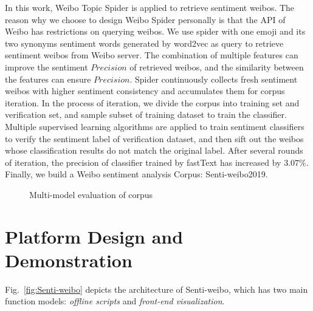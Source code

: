 \documentclass[runningheads]{llncs}
\begin{document}
In this work, Weibo Topic Spider is applied to retrieve sentiment weibos. The reason why we choose to design Weibo Spider personally is that the API of Weibo has restrictions on querying weibos. We use spider with one emoji and its two synonyms sentiment words generated by word2vec as query to retrieve sentiment weibos from Weibo server. The combination of multiple features can improve the sentiment $Precision$ of retrieved weibos, and the similarity between the features can ensure $Precision$. Spider continuously collects fresh sentiment weibos with higher sentiment consistency and accumulates them for corpus iteration. In the process of iteration, we divide the corpus into training set and verification set, and sample subset of training dataset to train the classifier. Multiple supervised learning algorithms are applied to train sentiment classifiers to verify the sentiment label of verification dataset, and then sift out the weibos whose classification results do not match the original label. After several rounds of iteration, the precision of classifier trained by fastText has increased by 3.07\%. Finally, we build a Weibo sentiment analysis Corpus: Senti-weibo2019. 

\begin{figure}[ht]
\vspace{-0.5cm}   %
\centering
{}
\caption{Multi-model evaluation of corpus}
\label{fig:corpus-evaluation}
\end{figure}

\section{Platform Design and Demonstration}
Fig.~\ref{fig:Senti-weibo} depicts the architecture of Senti-weibo, which has two main function models: \textit{offline scripts} and \textit{front-end visualization}.
\end{document}
